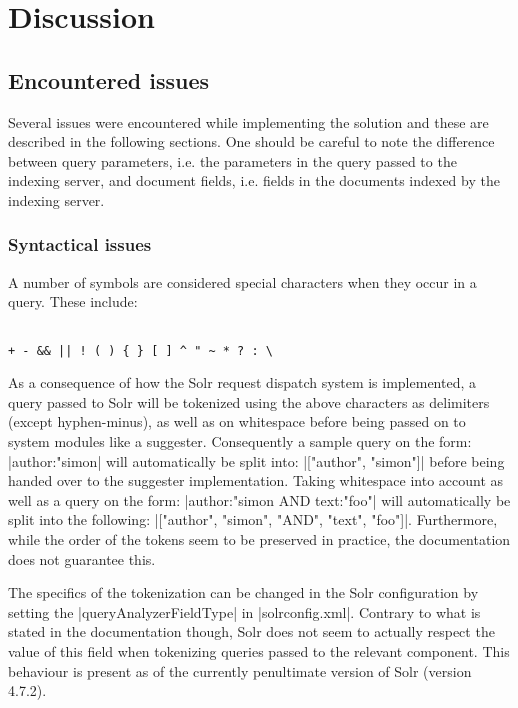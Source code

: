 \section{Discussion}\label{discussion}

\subsection{Encountered issues}

Several issues were encountered while implementing the solution and these are described in the following sections. One should be careful to note the difference between query parameters, i.e. the parameters in the query passed to the indexing server, and document fields, i.e. fields in the documents indexed by the indexing server.

\subsubsection{Syntactical issues}

A number of symbols are considered special characters when they occur in a query. These include\cite{QUERY}:
\begin{verbatim}

+ - && || ! ( ) { } [ ] ^ " ~ * ? : \
\end{verbatim}

As a consequence of how the Solr request dispatch system is implemented, a query passed to Solr will be tokenized using the above characters as delimiters (except hyphen-minus), as well as on whitespace before being passed on to system modules like a suggester.
Consequently a sample query on the form: |author:"simon| will automatically be split into: |["author", "simon"]|
before being handed over to the suggester implementation.
Taking whitespace into account as well as a query on the form: |author:"simon AND text:"foo"| will automatically be split into the following: |["author", "simon", "AND", "text", "foo"]|.
Furthermore, while the order of the tokens seem to be preserved in practice, the documentation does not guarantee this.

The specifics of the tokenization can be changed in the Solr configuration by setting the |queryAnalyzerFieldType| in |solrconfig.xml|. Contrary to what is stated in the documentation though, Solr does not seem to actually respect the value of this field when tokenizing queries passed to the relevant component. This behaviour is present as of the currently penultimate version of Solr (version 4.7.2).

